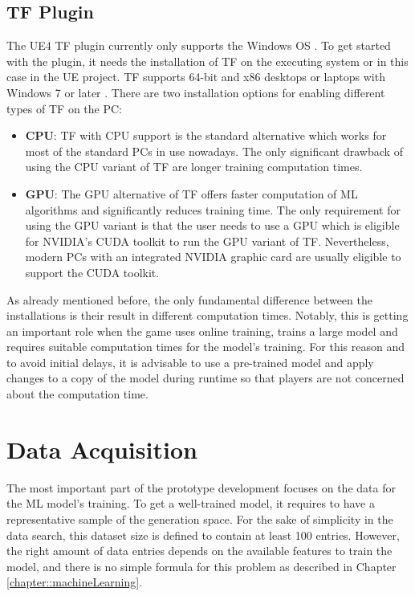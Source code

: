 \documentclass[MGS,Master,english]{twbook}%
\begin{document}
\subsection{\acl{TF} Plugin}
The \ac{UE4} \ac{TF} plugin currently only supports the Windows \ac{OS} \cite{ue4::tensorFlowPlugin}. To get started with the plugin, it needs the installation of \ac{TF} on the executing system or in this case in the UE project. \ac{TF} supports 64-bit and x86 desktops or laptops with Windows 7 or later \cite{api::tensorFlow}. There are two installation options for enabling different types of \ac{TF} on the \ac{PC}:
\begin{itemize}
	\item \textbf{\ac{CPU}}: \ac{TF} with \ac{CPU} support is the standard alternative which works for most of the standard PCs in use nowadays. The only significant drawback of using the \ac{CPU} variant of \ac{TF} are longer training computation times.
	\item \textbf{\ac{GPU}}: The \ac{GPU} alternative of \ac{TF} offers faster computation of \ac{ML} algorithms and significantly reduces training time. The only requirement for using the \ac{GPU} variant is that the user needs to use a \ac{GPU} which is eligible for NVIDIA's CUDA toolkit \cite{nvidia::cudaToolkit} to run the \ac{GPU} variant of \ac{TF}. Nevertheless, modern PCs with an integrated NVIDIA graphic card are usually eligible to support the CUDA toolkit. 
\end{itemize}

As already mentioned before, the only fundamental difference between the installations is their result in different computation times. Notably, this is getting an important role when the game uses online training, trains a large model and requires suitable computation times for the model's training. For this reason and to avoid initial delays, it is advisable to use a pre-trained model and apply changes to a copy of the model during runtime so that players are not concerned about the computation time.

\section{Data Acquisition}
The most important part of the prototype development focuses on the data for the \ac{ML} model's training. To get a well-trained model, it requires to have a representative sample of the generation space. For the sake of simplicity in the data search, this dataset size is defined to contain at least 100 entries. However, the right amount of data entries depends on the available features to train the model, and there is no simple formula for this problem as described in Chapter \ref{chapter::machineLearning}. 
\end{document}
